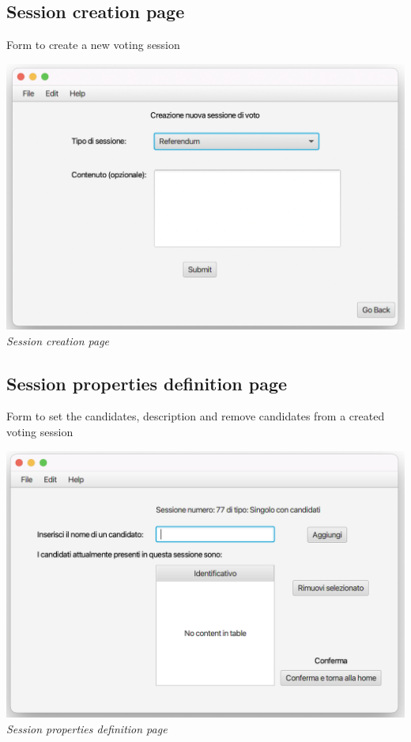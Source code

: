 \documentclass[11pt, oneside]{article}   	%
\begin{document}
\subsection{Session creation page}
Form to create a new voting session
    \begin{center}
    \includegraphics[scale=0.45]{images/ui6.png}\\
    \emph{Session creation page}
    \end{center}
\subsection{Session properties definition page}
Form to set the candidates, description and remove candidates from a created voting session
    \begin{center}
    \includegraphics[scale=0.6]{images/ui7.png}\\
    \emph{Session properties definition page}
    \end{center}
    
\end{document}
